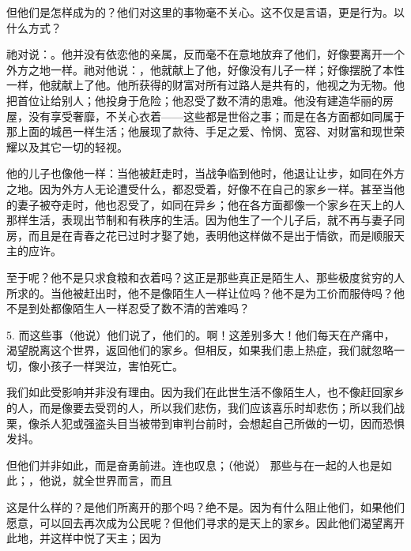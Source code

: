 但他们是怎样成为的？他们对这里的事物毫不关心。这不仅是言语，更是行为。以什么方式？\par

祂对说：。他并没有依恋他的亲属，反而毫不在意地放弃了他们，好像要离开一个外方之地一样。祂对他说：，他就献上了他，好像没有儿子一样；好像摆脱了本性一样，他就献上了他。他所获得的财富对所有过路人是共有的，他视之为无物。他把首位让给别人；他投身于危险；他忍受了数不清的患难。他没有建造华丽的房屋，没有享受奢靡，不关心衣着——这些都是世俗之事；而是在各方面都如同属于那上面的城邑一样生活；他展现了款待、手足之爱、怜悯、宽容、对财富和现世荣耀以及其它一切的轻视。\par

他的儿子也像他一样：当他被赶走时，当战争临到他时，他退让让步，如同在外方之地。因为外方人无论遭受什么，都忍受着，好像不在自己的家乡一样。甚至当他的妻子被夺走时，他也忍受了，如同在异乡；他在各方面都像一个家乡在天上的人那样生活，表现出节制和有秩序的生活。因为他生了一个儿子后，就不再与妻子同房，而且是在青春之花已过时才娶了她，表明他这样做不是出于情欲，而是顺服天主的应许。\par

至于呢？他不是只求食粮和衣着吗？这正是那些真正是陌生人、那些极度贫穷的人所求的。当他被赶出时，他不是像陌生人一样让位吗？他不是为工价而服侍吗？他不是到处都像陌生人一样忍受了数不清的苦难吗？\par

5. 而这些事（他说）他们说了，他们的。啊！这差别多大！他们每天在产痛中，渴望脱离这个世界，返回他们的家乡。但相反，如果我们患上热症，我们就忽略一切，像小孩子一样哭泣，害怕死亡。\par

我们如此受影响并非没有理由。因为我们在此世生活不像陌生人，也不像赶回家乡的人，而是像要去受罚的人，所以我们悲伤，我们应该喜乐时却悲伤；所以我们战栗，像杀人犯或强盗头目当被带到审判台前时，会想起自己所做的一切，因而恐惧发抖。\par

但他们并非如此，而是奋勇前进。连也叹息；（他说） 那些与在一起的人也是如此；，他说，就全世界而言，而且\par

这是什么样的？是他们所离开的那个吗？绝不是。因为有什么阻止他们，如果他们愿意，可以回去再次成为公民呢？但他们寻求的是天上的家乡。因此他们渴望离开此地，并这样中悦了天主；因为\par


